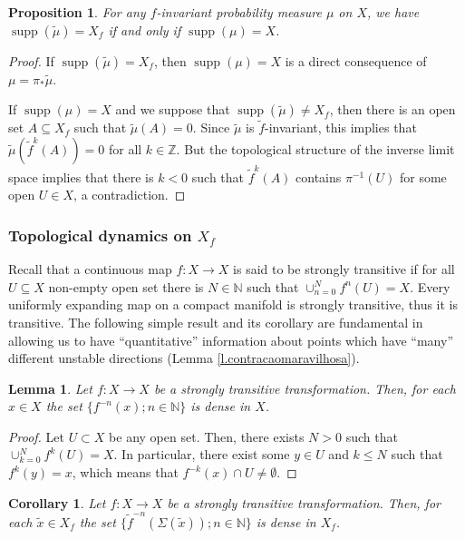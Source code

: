 \documentclass[a4paper,11pt,reqno]{amsart}
\newcommand{\N}{{\mathbb N}}
\newcommand{\tix}{\tilde{x}}
\newcommand{\tif}{\tilde{f}}
\newtheorem{corollary}{Corollary}
\newtheorem{lemma}[theorem]{Lemma}
\newtheorem{proposition}{Proposition}
\theoremstyle{definition}
\begin{document}
\begin{proposition}
    \label{prop:supp-mu}
    For any $f$-invariant probability measure $\mu$ on $X$, we have $\operatorname{supp}(\tilde{\mu})=X_f$ if and only if $\operatorname{supp}(\mu)=X$.
\end{proposition}

\begin{proof}
    If $\operatorname{supp}(\tilde{\mu})=X_f$, then $\operatorname{supp}(\mu)=X$ is a direct consequence of $\mu = \pi_* \tilde{\mu}$.

    If $\operatorname{supp}(\mu)=X$ and we suppose that $\operatorname{supp}(\tilde{\mu}) \neq X_f$, then there is an open set $A \subseteq X_f$ such that $\tilde{\mu}(A) = 0$. Since $\tilde{\mu}$ is $\tilde{f}$-invariant, this implies that $\tilde{\mu}(\tilde{f}^k(A)) = 0$ for all $k \in \mathbb{Z}$. But the topological structure of the inverse limit space implies that there is $k < 0$ such that $\tilde{f}^k(A)$ contains $\pi^{-1}(U)$ for some open $U \in X$, a contradiction.
\end{proof}

\subsubsection{Topological dynamics on $X_f$}

Recall that a continuous map $f: X \to X$ is said to be {strongly transitive} if for all $U \subseteq X$ non-empty open set there is $N \in \N$ such that {$\cup_{n=0}^N f^n(U) = X$}. Every uniformly expanding map on a compact manifold is {strongly transitive}, thus it is transitive. The following simple result and its corollary are fundamental in allowing us to have ``quantitative'' information about points which have ``many'' different unstable directions (Lemma \ref{l.contracaomaravilhosa}).

\begin{lemma}
  \label{lem:preorbitasdensas}
Let $f:X\to X$ be a {strongly transitive} transformation. Then, for each $x\in X$ the set $\{f^{-n}(x);n\in\N\}$ is dense in $X$.
\end{lemma}
\begin{proof}
Let $U\subset X$ be any open set. Then, there exists $N>0$ such that $\cup_{k=0}^N f^k(U)=X$. In particular, there exist some $y\in U$ and $k \leq N$ such that $f^k(y)=x$, which means that $f^{-k}(x)\cap U\neq\emptyset$. 
\end{proof}

\begin{corollary}
    \label{cor:perorbitascdensas}
Let $f:X\to X$ be a {strongly transitive} transformation. Then, for each $\tix\in X_f$ the set $\{\tif^{-n}(\Sigma(\tix));n\in\N\}$ is dense in $X_f$.    
\end{corollary}
\end{document}
